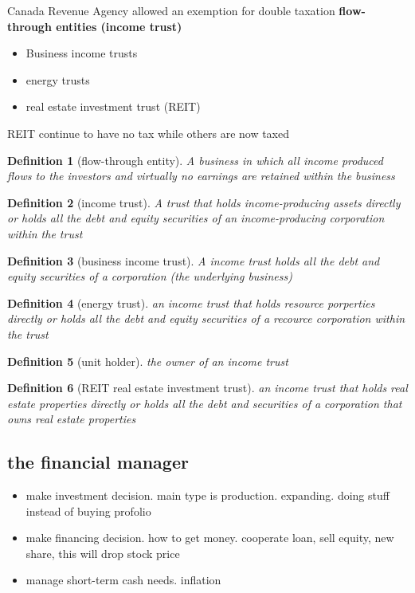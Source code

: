 \documentclass[10pt]{article}
\theoremstyle{break}
\newtheorem{defn}{Definition}[subsection]
\begin{document}
Canada Revenue Agency allowed an exemption for double taxation \textbf{flow-through entities (income trust)}
\begin{itemize}
    \item Business income trusts 
    \item energy trusts 
    \item real estate investment trust (REIT)
\end{itemize}
    REIT continue to have no tax while others are now taxed

\begin{defn}[flow-through entity]
    A business in which all income produced flows to the investors and virtually no earnings are retained within the business 
\end{defn}

\begin{defn}[income trust]
    A trust that holds income-producing assets directly or holds all the debt and equity securities of an income-producing corporation within the trust
\end{defn}

\begin{defn}[business income trust]
    A income trust holds all the debt and equity securities of a corporation (the underlying business)
\end{defn}

\begin{defn}[energy trust]
    an income trust that holds resource porperties directly or holds all the debt and equity securities of a recource corporation within the trust
\end{defn}

\begin{defn}[unit holder]
    the owner of an income trust
\end{defn}

\begin{defn}[REIT real estate investment trust]
    an income trust that holds real estate properties directly or holds all the debt and securities of a corporation that owns real estate properties
\end{defn}

\subsection{the financial manager}
\begin{itemize}
    \item make investment decision. main type is production. expanding. doing stuff instead of buying profolio  
    \item make financing decision. how to get money. cooperate loan, sell equity, new share, this will drop stock price
    \item manage short-term cash needs. inflation
\end{itemize}
\end{document}
